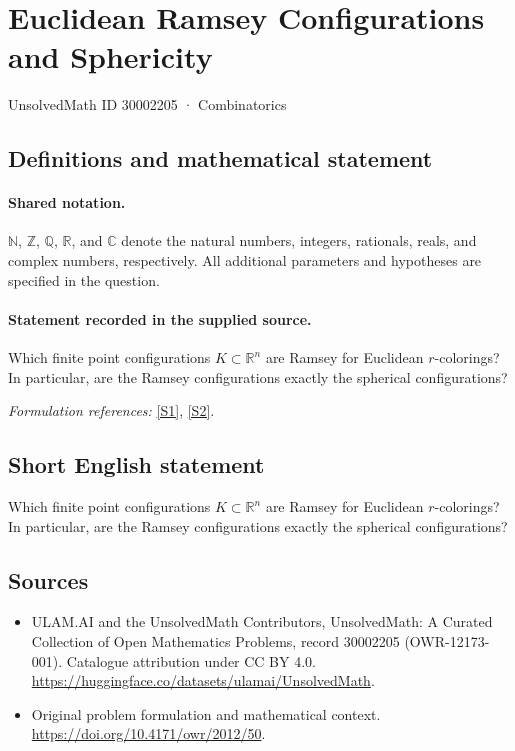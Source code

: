 \documentclass[11pt]{article}
\newcommand{\sref}[2]{\hyperlink{source:#1:#2}{[S#2]}}
\begin{document}
\setcounter{section}{30002204}
\section{Euclidean Ramsey Configurations and Sphericity}\label{30002205}
{\small UnsolvedMath ID 30002205 · Combinatorics}
\subsection{Definitions and mathematical statement}

\paragraph{Shared notation.}$\mathbb N$, $\mathbb Z$, $\mathbb Q$, $\mathbb R$, and $\mathbb C$ denote the natural numbers, integers, rationals, reals, and complex numbers, respectively. All additional parameters and hypotheses are specified in the question.


\paragraph{Statement recorded in the supplied source.}
Which finite point configurations $K\subset\mathbb R^n$ are Ramsey for Euclidean $r$-colorings? In particular, are the Ramsey configurations exactly the spherical configurations?
\par\smallskip\textit{Formulation references:} \sref{30002205}{1}, \sref{30002205}{2}.
\subsection{Short English statement}
Which finite point configurations $K\subset\mathbb R^n$ are Ramsey for Euclidean $r$-colorings? In particular, are the Ramsey configurations exactly the spherical configurations?
\subsection{Sources}
\begin{itemize}
\item[\hypertarget{source:30002205:1}{S1}] ULAM.AI and the UnsolvedMath Contributors, UnsolvedMath: A Curated Collection of Open Mathematics Problems, record 30002205 (OWR-12173-001). Catalogue attribution under CC BY 4.0.
\url{https://huggingface.co/datasets/ulamai/UnsolvedMath}.
\item[\hypertarget{source:30002205:2}{S2}] Original problem formulation and mathematical context.
\url{https://doi.org/10.4171/owr/2012/50}.
\end{itemize}
\label{end:30002205}
\end{document}
